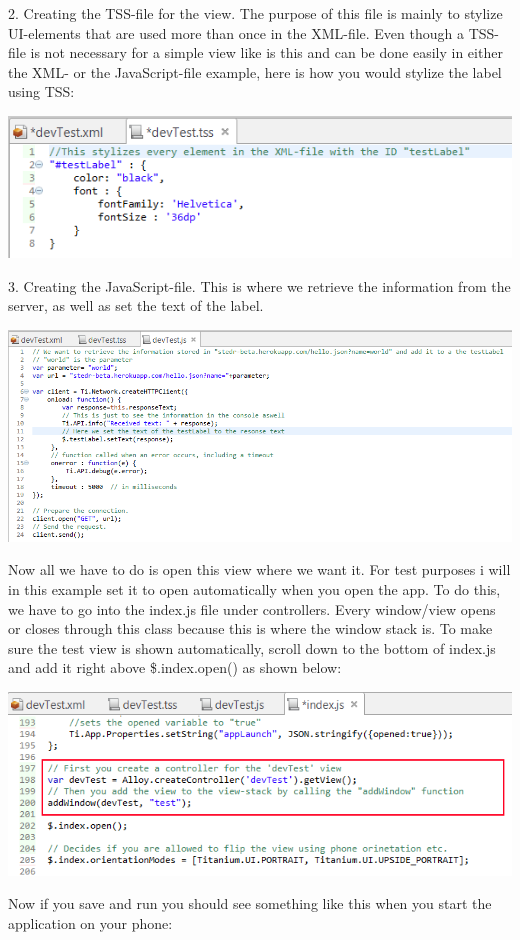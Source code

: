 2. Creating the TSS-file for the view. The purpose of this file is mainly to stylize UI-elements that are used more than once in the XML-file. Even though a TSS-file is not necessary for a simple view like is this and can be done easily in either the XML- or the JavaScript-file example, here is how you would stylize the label using TSS: 

\begin{center}
\includegraphics[scale=0.45]{guide/f8.png} 
\end{center}

3. Creating the JavaScript-file. This is where we retrieve the information from the server, as well as set the text of the label.

\begin{center}
\includegraphics[scale=0.45]{guide/f9.png} 
\end{center}

Now all we have to do is open this view where we want it. For test purposes i will in this example set it to open automatically when you open the app. To do this, we have to go into the index.js file under controllers. Every window/view opens or closes through this class because this is where the window stack is. To make sure the test view is shown automatically, scroll down to the bottom of index.js and add it right above \$.index.open() as shown below:

\begin{center}
\includegraphics[scale=0.45]{guide/f10.png} 
\end{center}
Now if you save and run you should see something like this when you start the application on your phone:

